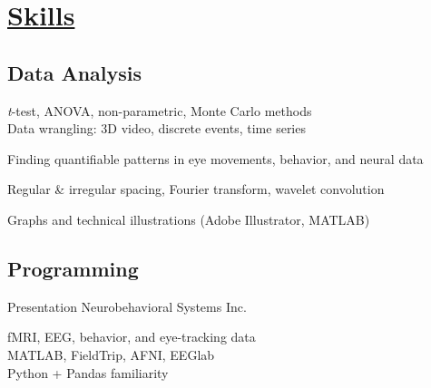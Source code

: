 \documentclass[]{winter-resume-openfont}
\begin{document}
\hfill
\begin{minipage}[t]{0.3\textwidth} 



\sectionsep
\sectionsep


\section{\underline{Skills}}
\sectionsep
\subsection{Data Analysis}
\textbullet{} \emph{t}-test, ANOVA, non-parametric, Monte Carlo methods \\
\sectionsep
\textbullet{} Data wrangling: 3D video, discrete events, time series
\sectionsep
 

\textbullet{} Finding quantifiable patterns in eye movements, behavior, and neural data \\
\sectionsep
 
\textbullet{}  Regular \& irregular spacing, Fourier transform, wavelet convolution \\
\sectionsep
 

\textbullet{}  Graphs and technical illustrations (Adobe Illustrator, MATLAB) \\
 
 \sectionsep
\sectionsep
\subsection{Programming}
\textbullet{}  Presentation Neurobehavioral Systems Inc. \\
\sectionsep
 

\textbullet{}  fMRI, EEG, behavior, and eye-tracking data \\
\sectionsep
\textbullet{}  MATLAB, FieldTrip, AFNI, EEGlab \\
\sectionsep
\textbullet{}  Python + Pandas familiarity \\

\sectionsep
\sectionsep

\end{minipage}
\end{document}
